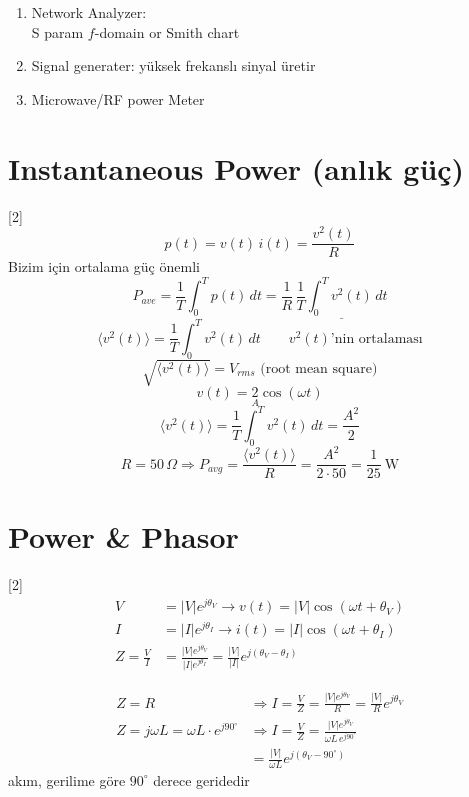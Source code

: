 \documentclass[11pt,a4paper]{article}
\begin{document}
\begin{enumerate}[label=\arabic*),start=3]
\item Network Analyzer: \\ S param \quad $f$-domain or Smith chart
\item Signal generater: yüksek frekanslı sinyal üretir
\item Microwave/RF power Meter
\end{enumerate}

\section{Instantaneous Power (anlık güç)}
[2]
\[ p(t) = v(t)\,i(t) = \frac{v^2(t)}{R} \]
Bizim için ortalama güç önemli
\[ P_{ave} = \frac{1}{T}\int_0^T p(t)\,dt = \frac{1}{R}\,\underline{\frac{1}{T}\int_0^T v^2(t)\,dt} \]
\[ \langle v^2(t)\rangle = \frac{1}{T}\int_0^T v^2(t)\,dt \qquad \text{$v^2(t)$'nin ortalaması} \]
\[ \sqrt{\langle v^2(t)\rangle} = V_{rms} \text{ (root mean square)} \]
\[ v(t) = \underset{A}{2}\cos(\omega t) \]
\[ \langle v^2(t)\rangle = \frac{1}{T}\int_0^T v^2(t)\,dt = \frac{A^2}{2} \]
\[ R = 50\,\Omega \Rightarrow P_{avg} = \frac{\langle v^2(t)\rangle}{R} = \frac{A^2}{2\cdot 50} = \frac{1}{25}\ \mathrm{W} \]

\section{Power \& Phasor}
[2]
\begin{align*}
V &= |V|e^{j\theta_V} \to v(t) = |V|\cos(\omega t + \theta_V)\\
I &= |I|e^{j\theta_I} \to i(t) = |I|\cos(\omega t + \theta_I)\\
Z = \frac{V}{I} &= \frac{|V|e^{j\theta_V}}{|I|e^{j\theta_I}} = \frac{|V|}{|I|}e^{j(\theta_V-\theta_I)}
\end{align*}

\begin{align*}
Z = R &\Rightarrow I = \frac{V}{Z} = \frac{|V|e^{j\theta_V}}{R} = \frac{|V|}{R}e^{j\theta_V}\\
Z = j\omega L = \omega L\cdot e^{j90^\circ} &\Rightarrow I = \frac{V}{Z} = \frac{|V|e^{j\theta_V}}{\omega L\,e^{j90^\circ}}\\
&= \frac{|V|}{\omega L}e^{j(\theta_V-90^\circ)}
\end{align*}
akım, gerilime göre $90^\circ$ derece geridedir
\end{document}
